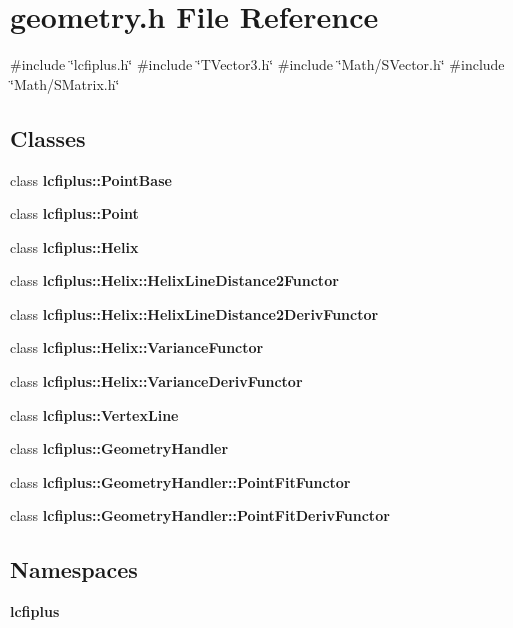 \section{geometry.\+h File Reference}
\label{geometry_8h}
{\ttfamily \#include \char`\"{}lcfiplus.\+h\char`\"{}}\newline
{\ttfamily \#include \char`\"{}T\+Vector3.\+h\char`\"{}}\newline
{\ttfamily \#include \char`\"{}Math/\+S\+Vector.\+h\char`\"{}}\newline
{\ttfamily \#include \char`\"{}Math/\+S\+Matrix.\+h\char`\"{}}\newline
\subsection*{Classes}
\begin{DoxyCompactItemize}
\item 
class \textbf{ lcfiplus\+::\+Point\+Base}
\item 
class \textbf{ lcfiplus\+::\+Point}
\item 
class \textbf{ lcfiplus\+::\+Helix}
\item 
class \textbf{ lcfiplus\+::\+Helix\+::\+Helix\+Line\+Distance2\+Functor}
\item 
class \textbf{ lcfiplus\+::\+Helix\+::\+Helix\+Line\+Distance2\+Deriv\+Functor}
\item 
class \textbf{ lcfiplus\+::\+Helix\+::\+Variance\+Functor}
\item 
class \textbf{ lcfiplus\+::\+Helix\+::\+Variance\+Deriv\+Functor}
\item 
class \textbf{ lcfiplus\+::\+Vertex\+Line}
\item 
class \textbf{ lcfiplus\+::\+Geometry\+Handler}
\item 
class \textbf{ lcfiplus\+::\+Geometry\+Handler\+::\+Point\+Fit\+Functor}
\item 
class \textbf{ lcfiplus\+::\+Geometry\+Handler\+::\+Point\+Fit\+Deriv\+Functor}
\end{DoxyCompactItemize}
\subsection*{Namespaces}
\begin{DoxyCompactItemize}
\item 
 \textbf{ lcfiplus}
\end{DoxyCompactItemize}
